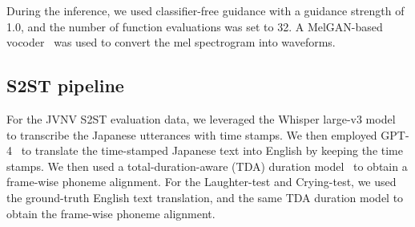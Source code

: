 During the inference, we used classifier-free guidance with a guidance strength of 1.0, and the number of function evaluations was set to 32. 
A MelGAN-based vocoder~\cite{kumar2019melgan} was used to convert the mel spectrogram into waveforms.


\vspace{-.5em}
\subsection{S2ST pipeline} %
\vspace{-.5em}

For the JVNV S2ST evaluation data, we leveraged the Whisper large-v3 model~\cite{radford2023robust} to transcribe the Japanese utterances with time stamps. We then employed GPT-4~\cite{achiam2023gpt} to translate the time-stamped Japanese text into English by keeping the time stamps.
We then used a total-duration-aware (TDA) duration model~\cite{eskimez2024total} to obtain a frame-wise phoneme alignment.
For the Laughter-test and Crying-test, we used the ground-truth English text translation,
and the same TDA duration model
to obtain the frame-wise phoneme alignment.
